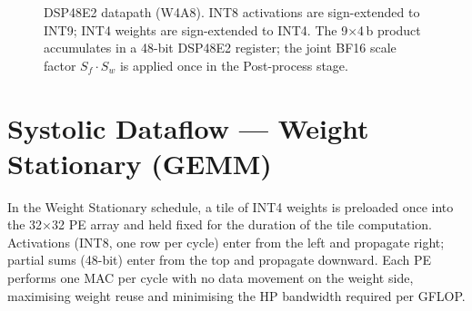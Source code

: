 \documentclass[11pt,a4paper,twoside,openany]{report}
\begin{document}
\begin{figure}[h]
\centering
{}
\caption{DSP48E2 datapath (W4A8). INT8 activations are sign-extended to
INT9; INT4 weights are sign-extended to INT4. The 9$\times$4\,b product
accumulates in a 48-bit DSP48E2 register; the joint BF16 scale factor
$S_f \cdot S_w$ is applied once in the Post-process stage.}
\label{fig:dsp-datapath}
\end{figure}

\section{Systolic Dataflow — Weight Stationary (GEMM)}

In the Weight Stationary schedule, a tile of INT4 weights is preloaded
once into the 32$\times$32 PE array and held fixed for the duration of
the tile computation.  Activations (INT8, one row per cycle) enter from
the left and propagate right; partial sums (48-bit) enter from the top
and propagate downward.  Each PE performs one MAC per cycle with no data
movement on the weight side, maximising weight reuse and minimising the
HP bandwidth required per GFLOP.
\end{document}
